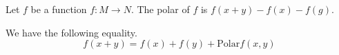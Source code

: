 %

\begin{definition}
  Let $f$ be a function $f : M \to N$. The polar of $f$ is $f(x + y) - f(x) - f(g)$.
\end{definition}

\begin{theorem}
  We have the following equality.
$$
  f(x + y) = f(x) + f(y) + \mathrm{Polar} f(x,y)
$$
\end{theorem}
